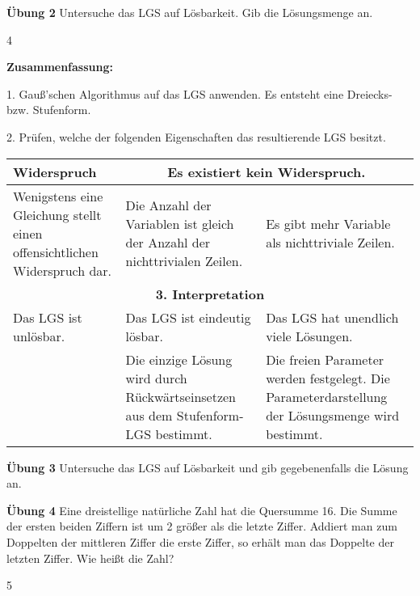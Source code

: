 \documentclass{article}
\begin{document}
\textbf{Übung 2} Untersuche das LGS auf Lösbarkeit. Gib die Lösungsmenge an.

\hfill 4

\newpage

\textbf{Zusammenfassung:}

1. Gauß'schen Algorithmus auf das LGS anwenden.
Es entsteht eine Dreiecks- bzw. Stufenform.

2. Prüfen, welche der folgenden Eigenschaften das resultierende LGS besitzt.

\begin{center}
\begin{tabular}{|p{4cm}|p{4cm}|p{4cm}|}
\hline
\textbf{Widerspruch} & \multicolumn{2}{c|}{\textbf{Es existiert kein Widerspruch.}} \\
\hline
Wenigstens eine Gleichung stellt einen offensichtlichen Widerspruch dar. & Die Anzahl der Variablen ist gleich der Anzahl der nichttrivialen Zeilen. & Es gibt mehr Variable als nichttriviale Zeilen. \\
\hline
\multicolumn{3}{|c|}{\textbf{3. Interpretation}} \\
\hline
Das LGS ist unlösbar. & Das LGS ist eindeutig lösbar. & Das LGS hat unendlich viele Lösungen. \\
\hline
& Die einzige Lösung wird durch Rückwärtseinsetzen aus dem Stufenform-LGS bestimmt. & Die freien Parameter werden festgelegt. Die Parameterdarstellung der Lösungsmenge wird bestimmt. \\
\hline
\end{tabular}
\end{center}

\textbf{Übung 3} Untersuche das LGS auf Lösbarkeit und gib gegebenenfalls die Lösung an.

\textbf{Übung 4} Eine dreistellige natürliche Zahl hat die Quersumme 16. Die Summe der ersten beiden Ziffern ist um 2 größer als die letzte Ziffer. Addiert man zum Doppelten der mittleren Ziffer die erste Ziffer, so erhält man das Doppelte der letzten Ziffer. Wie heißt die Zahl?

\hfill 5
\end{document}
